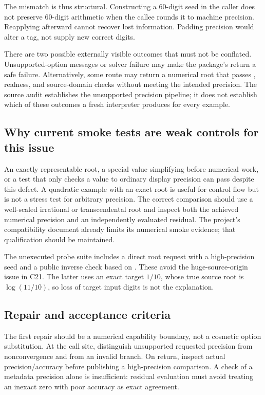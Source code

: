 \documentclass[11pt,letterpaper]{article}
\newcommand{\code}[1]{\texttt{\detokenize{#1}}}
\begin{document}
The mismatch is thus structural. Constructing a 60-digit seed in the caller does not preserve 60-digit arithmetic when the callee rounds it to machine precision. Reapplying \code{N[root,50]} afterward cannot recover lost information. Padding precision would alter a tag, not supply new correct digits.

There are two possible externally visible outcomes that must not be conflated. Unsupported-option messages or solver failure may make the package's \code{Check} return a safe failure. Alternatively, some route may return a numerical root that passes \code{NumericQ}, realness, and source-domain checks without meeting the intended precision. The source audit establishes the unsupported precision pipeline; it does not establish which of these outcomes a fresh interpreter produces for every example.

\subsection{Why current smoke tests are weak controls for this issue}

An exactly representable root, a special value simplifying before numerical work, or a test that only checks a value to ordinary display precision can pass despite this defect. A quadratic example with an exact root is useful for control flow but is not a stress test for arbitrary precision. The correct comparison should use a well-scaled irrational or transcendental root and inspect both the achieved numerical precision and an independently evaluated residual. The project's compatibility document already limits its numerical smoke evidence; that qualification should be maintained.\cite{mathics-doc}

The unexecuted probe suite includes a direct \code{Exp[x]==2} root request with a high-precision seed and a public inverse check based on \code{Exp[x]-1}. These avoid the huge-source-origin issue in C21. The latter uses an exact target $1/10$, whose true source root is $\log(11/10)$, so loss of target input digits is not the explanation.

\subsection{Repair and acceptance criteria}

The first repair should be a numerical capability boundary, not a cosmetic option substitution. At the call site, distinguish unsupported requested precision from nonconvergence and from an invalid branch. On return, inspect actual precision/accuracy before publishing a high-precision comparison. A check of a metadata precision alone is insufficient: residual evaluation must avoid treating an inexact zero with poor accuracy as exact agreement.
\end{document}
